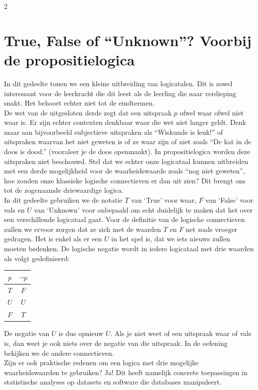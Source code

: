 \begin{multicols}{2}
\section{True, False of ``Unknown''? Voorbij de propositielogica}
In dit gedeelte tonen we een kleine uitbreiding van logicatalen.
Dit is zowel interessant voor de leerkracht die dit leest als de leerling die naar verdieping snakt.
Het behoort echter niet tot de eindtermen.\\

De wet van de uitgesloten derde zegt dat een uitspraak $p$ ofwel waar ofwel niet waar is.
Er zijn echter contexten denkbaar waar die wet niet langer geldt.
Denk maar aan bijvoorbeeld subjectieve uitspraken als ``Wiskunde is leuk!'' of uitspraken waarvan het niet geweten is of ze waar zijn of niet zoals ``De kat in de doos is dood.'' (vooraleer je de doos openmaakt).
In propositielogica worden deze uitspraken niet beschouwd.
Stel dat we echter onze logicataal kunnen uitbreiden met een derde mogelijkheid voor de waarheidswaarde zoals ``nog niet geweten'', hoe zouden onze klassieke logische connectieven er dan uit zien?
Dit brengt ons tot de zogenaamde driewaardige logica.\\

In dit gedeelte gebruiken we de notatie $T$ van `True' voor waar, $F$ van `False' voor vals en $U$ van `Unknown' voor onbepaald om echt duidelijk te maken dat het over een verschillende logicataal gaat.
Voor de definitie van de logische connectieven zullen we ervoor zorgen dat ze zich met de waarden $T$ en $F$ net zoals vroeger gedragen.
Het is enkel als er een $U$ in het spel is, dat we iets nieuws zullen moeten bedenken.
De logische negatie wordt in iedere logicataal met drie waarden als volgt gedefinieerd:
\begin{center}
\begin{tabular}{c|c}  
$p$ & $\lnot p$\\
\hline
$T$ & $F$\\
$U$ & $U$\\
$F$ & $T$
\end{tabular}
\end{center}
De negatie van $U$ is dus opnieuw $U$.
Als je niet weet of een uitspraak waar of vals is, dan weet je ook niets over de negatie van die uitspraak.
In de oefening bekijken we de andere connectieven.\\

Zijn er ook praktische redenen om een logica met drie mogelijke waarheidswaarden te gebruiken?
Ja!
Dit heeft namelijk concrete toepassingen in statistische analyses op datasets en software die databases manipuleert.\\


\end{multicols}
